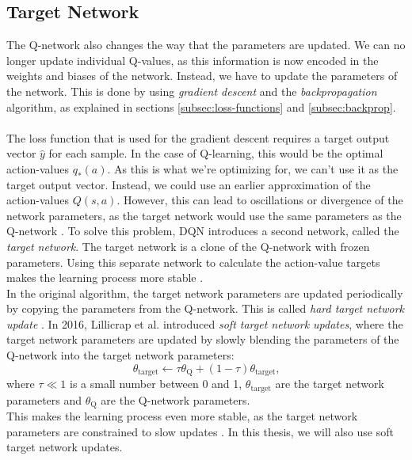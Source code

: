 \subsection{Target Network}
\label{subsec:target-network}
The Q-network also changes the way that the parameters are updated.
We can no longer update individual Q-values, as this information is now encoded in the weights and biases of the network.
Instead, we have to update the parameters of the network.
This is done by using  \textit{gradient descent} and the \textit{backpropagation} algorithm, as explained in sections \ref{subsec:loss-functions} and \ref{subsec:backprop}.
\\
\\
The loss function that is used for the gradient descent requires a target output vector $\hat{y}$ for each sample. In the case of Q-learning, this would be the optimal action-values $q_*(a)$. As this is what we're optimizing for, we can't use it as the target output vector. Instead, we could use an earlier approximation of the action-values $Q(s,a)$. However, this can lead to oscillations or divergence of the network parameters, as the target network would use the same parameters as the Q-network \cite{mnih_human-level_2015}. To solve this problem, DQN introduces a second network, called the \textit{target network}. The target network is a clone of the Q-network with frozen parameters. Using this separate network to calculate the action-value targets makes the learning process more stable \cite{mnih_human-level_2015}.
\\
In the original algorithm, the target network parameters are updated periodically by copying the parameters from the Q-network. This is called \textit{hard target network update} \cite{mnih_human-level_2015}. In 2016, Lillicrap et al. \cite{lillicrap_continuous_2015} introduced \textit{soft target network updates}, where the target network parameters are updated by slowly blending the parameters of the Q-network into the target network parameters:
\begin{equation}
    \theta_{\text{target}} \gets \tau \theta_{\text{Q}} + (1 - \tau) \theta_{\text{target}} \text{,}
    \label{eq:soft-target-update}
\end{equation}
where $\tau\ll1$ is a small number between 0 and 1, $\theta_{\text{target}}$ are the target network parameters and $\theta_{\text{Q}}$ are the Q-network parameters.
\\
This makes the learning process even more stable, as the target network parameters are constrained to slow updates \cite{lillicrap_continuous_2015}. In this thesis, we will also use soft target network updates.

